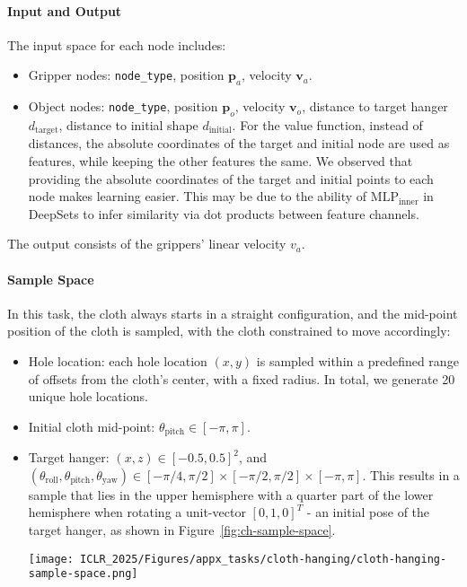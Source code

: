 


\paragraph{Input and Output}
The input space for each node includes:
\begin{itemize}
    \item Gripper nodes: \texttt{node\_type}, position $\mathbf{p}_a$, velocity $\mathbf{v}_a$.
    \item Object nodes: \texttt{node\_type}, position $\mathbf{p}_o$, velocity $\mathbf{v}_o$, distance to target hanger $d_{\text{target}}$, distance to initial shape $d_{\text{initial}}$. For the value function, instead of distances, the absolute coordinates of the target and initial node are used as features, while keeping the other features the same. We observed that providing the absolute coordinates of the target and initial points to each node makes learning easier. This may be due to the ability of $\text{MLP}_{\text{inner}}$ in DeepSets to infer similarity via dot products between feature channels.
\end{itemize}
The output consists of the grippers' linear velocity $v_a$.

\paragraph{Sample Space}
In this task, the cloth always starts in a straight configuration, and the mid-point position of the cloth is sampled, with the cloth constrained to move accordingly:
\begin{itemize}
    \item Hole location: each hole location $(x, y)$ is sampled within a predefined range of offsets from the cloth's center, with a fixed radius. In total, we generate 20 unique hole locations.

    \item Initial cloth mid-point: $\theta_\text{pitch} \in [-\pi, \pi]$.
    \item Target hanger: $(x, z) \in [-0.5, 0.5]^2$, and $(\theta_\text{roll}, \theta_\text{pitch}, \theta_\text{yaw}) \in [-\pi / 4, \pi / 2] \times [-\pi / 2, \pi / 2] \times [-\pi, \pi]$. This results in a sample that lies in the upper hemisphere with a quarter part of the lower hemisphere when rotating a unit-vector $[0, 1, 0]^T$ - an initial pose of the target hanger, as shown in Figure~\ref{fig:ch-sample-space}.
    \begin{figure*}[ht]
        \centering
        \texttt{[image: ICLR\_2025/Figures/appx\_tasks/cloth-hanging/cloth-hanging-sample-space.png]}
        \caption{Sample space of the Cloth-Hanging task.}
    
        \label{fig:ch-sample-space}
    \end{figure*}
\end{itemize}

